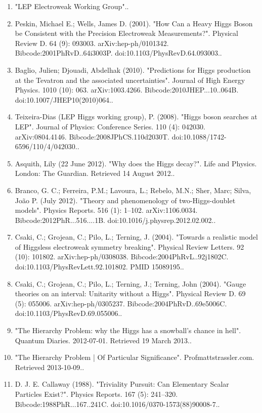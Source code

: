 \begin{enumerate}
    \item "LEP Electroweak Working Group"..
    \item Peskin, Michael E.; Wells, James D. (2001). "How Can a Heavy Higgs Boson be Consistent with the Precision Electroweak Measurements?". Physical Review D. 64 (9): 093003. arXiv:hep-ph/0101342. Bibcode:2001PhRvD..64i3003P. doi:10.1103/PhysRevD.64.093003..
    \item Baglio, Julien; Djouadi, Abdelhak (2010). "Predictions for Higgs production at the Tevatron and the associated uncertainties". Journal of High Energy Physics. 1010 (10): 063. arXiv:1003.4266. Bibcode:2010JHEP...10..064B. doi:10.1007/JHEP10(2010)064..
    \item Teixeira-Dias (LEP Higgs working group), P. (2008). "Higgs boson searches at LEP". Journal of Physics: Conference Series. 110 (4): 042030. arXiv:0804.4146. Bibcode:2008JPhCS.110d2030T. doi:10.1088/1742-6596/110/4/042030..
    \item Asquith, Lily (22 June 2012). "Why does the Higgs decay?". Life and Physics. London: The Guardian. Retrieved 14 August 2012..
    \item Branco, G. C.; Ferreira, P.M.; Lavoura, L.; Rebelo, M.N.; Sher, Marc; Silva, João P. (July 2012). "Theory and phenomenology of two-Higgs-doublet models". Physics Reports. 516 (1): 1–102. arXiv:1106.0034. Bibcode:2012PhR...516....1B. doi:10.1016/j.physrep.2012.02.002..
    \item Csaki, C.; Grojean, C.; Pilo, L.; Terning, J. (2004). "Towards a realistic model of Higgsless electroweak symmetry breaking". Physical Review Letters. 92 (10): 101802. arXiv:hep-ph/0308038. Bibcode:2004PhRvL..92j1802C. doi:10.1103/PhysRevLett.92.101802. PMID 15089195..
    \item Csaki, C.; Grojean, C.; Pilo, L.; Terning, J.; Terning, John (2004). "Gauge theories on an interval: Unitarity without a Higgs". Physical Review D. 69 (5): 055006. arXiv:hep-ph/0305237. Bibcode:2004PhRvD..69e5006C. doi:10.1103/PhysRevD.69.055006..
    \item "The Hierarchy Problem: why the Higgs has a snowball's chance in hell". Quantum Diaries. 2012-07-01. Retrieved 19 March 2013..
    \item "The Hierarchy Problem | Of Particular Significance". Profmattstrassler.com. Retrieved 2013-10-09..
    \item D. J. E. Callaway (1988). "Triviality Pursuit: Can Elementary Scalar Particles Exist?". Physics Reports. 167 (5): 241–320. Bibcode:1988PhR...167..241C. doi:10.1016/0370-1573(88)90008-7..

\end{enumerate}
